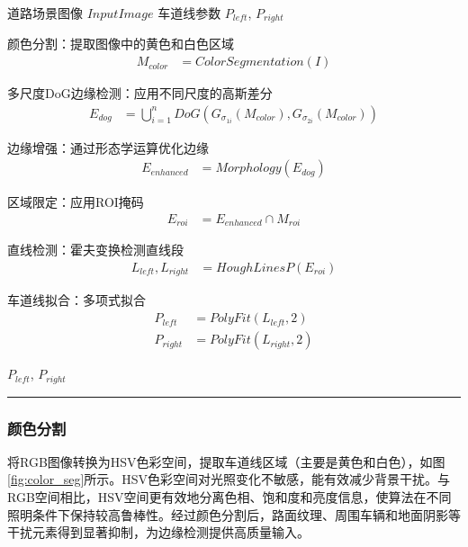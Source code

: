 \documentclass[a4paper, UTF8, fontsize=12pt]{ctexart} %
\numberwithin{equation}{section} %
\begin{document}
\begin{algorithm}[H]
\caption{\textbf{车道线检测算法}}
\label{alg:lane_detection}
\begin{algorithmic}[1]
\REQUIRE 道路场景图像 $Input Image$
\ENSURE 车道线参数 $P_{left}$, $P_{right}$

\STATE 颜色分割：提取图像中的黄色和白色区域
\begin{align*}
    M_{color} &= ColorSegmentation(I)
\end{align*}

\STATE 多尺度DoG边缘检测：应用不同尺度的高斯差分
\begin{align*}
    E_{dog} &= \bigcup_{i=1}^{n} DoG(G_{\sigma_{1i}}(M_{color}), G_{\sigma_{2i}}(M_{color}))
\end{align*}

\STATE 边缘增强：通过形态学运算优化边缘
\begin{align*}
    E_{enhanced} &= Morphology(E_{dog})
\end{align*}

\STATE 区域限定：应用ROI掩码
\begin{align*}
    E_{roi} &= E_{enhanced} \cap M_{roi}
\end{align*}

\STATE 直线检测：霍夫变换检测直线段
\begin{align*}
    L_{left}, L_{right} &= HoughLinesP(E_{roi})
\end{align*}

\STATE 车道线拟合：多项式拟合
\begin{align*}
    P_{left} &= PolyFit(L_{left}, 2) \\
    P_{right} &= PolyFit(L_{right}, 2)
\end{align*}

\RETURN $P_{left}$, $P_{right}$
\end{algorithmic}
\end{algorithm}

\noindent\rule{\textwidth}{0.4pt}


\subsubsection{颜色分割}
将RGB图像转换为HSV色彩空间，提取车道线区域（主要是黄色和白色），如图\ref{fig:color_seg}所示。HSV色彩空间对光照变化不敏感，能有效减少背景干扰。与RGB空间相比，HSV空间更有效地分离色相、饱和度和亮度信息，使算法在不同照明条件下保持较高鲁棒性。经过颜色分割后，路面纹理、周围车辆和地面阴影等干扰元素得到显著抑制，为边缘检测提供高质量输入。
\end{document}
